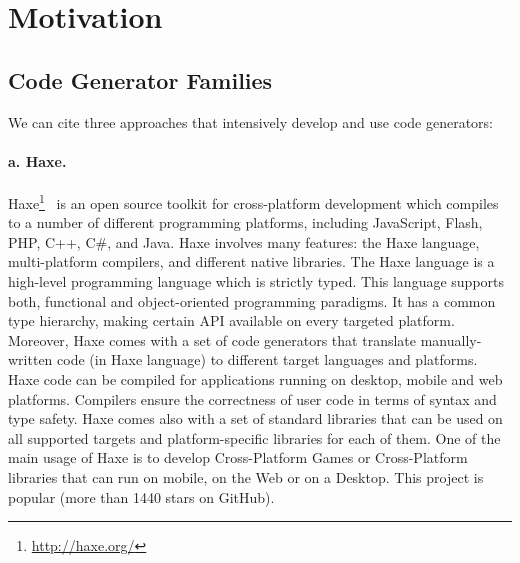 


\section{Motivation}

\subsection{Code Generator Families}

We can cite three approaches that intensively develop and use code generators: 

\paragraph{a. Haxe.} 	Haxe\footnote{\url{http://haxe.org/}}~\cite{dasnois2011haxe} is an open source toolkit for cross-platform development which compiles to a number of different programming platforms, including JavaScript, Flash, PHP, C++, C\#, and Java. Haxe involves many features: the Haxe language, multi-platform compilers, and different native libraries. The Haxe language is a high-level programming language which is strictly typed. This language supports both, functional and object-oriented programming paradigms. It has a common type hierarchy, making certain API available on every targeted platform. Moreover, Haxe comes with a set of code generators that translate manually-written code (in Haxe language) to different target languages and platforms.  Haxe code can be compiled for applications running on desktop, mobile and web platforms. Compilers ensure the correctness of user code in terms of syntax and type safety. Haxe comes also with a set of standard libraries that can be used on all supported targets and platform-specific libraries for each of them. One of the main usage of Haxe is to develop Cross-Platform Games or Cross-Platform libraries that can run on mobile, on the Web or on a Desktop.  This project is popular (more than \num{1440} stars on GitHub).

